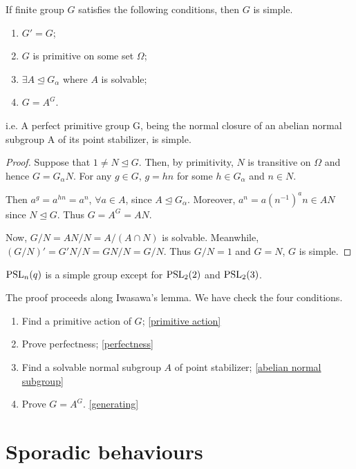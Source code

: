 \documentclass[a4paper,11pt]{article}
\def\subtitle#1{\section{#1}}
\begin{document}
\begin{lemma}[Iwasawa]
    If finite group $G$ satisfies the following conditions, then $G$ is simple.
    \begin{enumerate}[itemsep=0pt,label=\roman*.]
        \item $G'=G$;
        \item $G$ is primitive on some set $\Omega$;
        \item $\exists A\trianglelefteq G_\alpha$ where $A$ is solvable;
        \item $G=A^G$.
    \end{enumerate}
    i.e. A perfect primitive group G, being the normal
    closure of an abelian normal subgroup A of its point stabilizer, is simple.
\end{lemma}
\begin{proof}
    Suppose that $1\neq N\trianglelefteq G$. Then, by primitivity, $N$ is transitive on $\Omega$ and hence $G=G_\alpha N$. For any $g\in G$, $g=hn$ for some $h\in G_\alpha$ and $n\in N$. 
    
    Then $a^g=a^{hn}=a^n$, $\forall a\in A$, since $A\trianglelefteq G_\alpha$. Moreover, $a^n=a(n^{-1})^{a}n\in AN$ since $N\trianglelefteq G$. Thus $G=A^G= AN$.
    
    Now, $G/N=AN/N=A/(A\cap N)$ is solvable. Meanwhile, $(G/N)'=G'N/N=GN/N=G/N$. Thus $G/N=1$ and $G=N$, $G$ is simple.
\end{proof}

\begin{theorem}
    $\mathrm{PSL}_n(q)$ is a simple group except for $\mathrm{PSL}_2(2)$ and $\mathrm{PSL}_2(3)$.
\end{theorem}

The proof proceeds along Iwasawa's lemma. We have check the four conditions.
\begin{enumerate}[itemsep=0pt,label=\roman*.]
    \item Find a primitive action of $G$; \ref{primitive action}
    \item Prove perfectness; \ref{perfectness}
    \item Find a solvable normal subgroup $A$ of point stabilizer; \ref{abelian normal subgroup}
    \item Prove $G=A^G$. \ref{generating}
\end{enumerate}



\subtitle{Sporadic behaviours}
\end{document}
